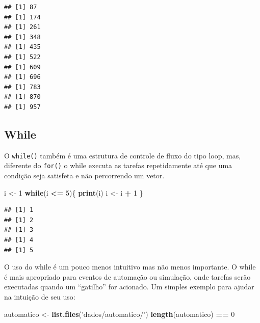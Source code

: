 \documentclass[]{book}
\newenvironment{Shaded}{\begin{snugshade}}{\end{snugshade}}
\newcommand{\KeywordTok}[1]{\textcolor[rgb]{0.13,0.29,0.53}{\textbf{#1}}}
\newcommand{\DecValTok}[1]{\textcolor[rgb]{0.00,0.00,0.81}{#1}}
\newcommand{\StringTok}[1]{\textcolor[rgb]{0.31,0.60,0.02}{#1}}
\newcommand{\ControlFlowTok}[1]{\textcolor[rgb]{0.13,0.29,0.53}{\textbf{#1}}}
\newcommand{\OperatorTok}[1]{\textcolor[rgb]{0.81,0.36,0.00}{\textbf{#1}}}
\newcommand{\NormalTok}[1]{#1}
\begin{document}
\begin{Shaded}
\end{Shaded}

\begin{verbatim}
## [1] 87
## [1] 174
## [1] 261
## [1] 348
## [1] 435
## [1] 522
## [1] 609
## [1] 696
## [1] 783
## [1] 870
## [1] 957
\end{verbatim}

\subsection{While}\label{while}

O \texttt{while()} também é uma estrutura de controle de fluxo do tipo
loop, mas, diferente do \texttt{for()} o while executa as tarefas
repetidamente até que uma condição seja satisfeta e não percorrendo um
vetor.

\begin{Shaded}
\begin{Highlighting}[]
\NormalTok{i <-}\StringTok{ }\DecValTok{1}
\ControlFlowTok{while}\NormalTok{(i }\OperatorTok{<=}\StringTok{ }\DecValTok{5}\NormalTok{)\{}
  \KeywordTok{print}\NormalTok{(i)}
\NormalTok{  i <-}\StringTok{ }\NormalTok{i }\OperatorTok{+}\StringTok{ }\DecValTok{1}
\NormalTok{\}}
\end{Highlighting}
\end{Shaded}

\begin{verbatim}
## [1] 1
## [1] 2
## [1] 3
## [1] 4
## [1] 5
\end{verbatim}

O uso do while é um pouco menos intuitivo mas não menos importante. O
while é mais apropriado para eventos de automação ou simulação, onde
tarefas serão executadas quando um ``gatilho'' for acionado. Um simples
exemplo para ajudar na intuição de seu uso:

\begin{Shaded}
\begin{Highlighting}[]
\NormalTok{automatico <-}\StringTok{ }\KeywordTok{list.files}\NormalTok{(}\StringTok{'dados/automatico/'}\NormalTok{)}
\KeywordTok{length}\NormalTok{(automatico) }\OperatorTok{==}\StringTok{ }\DecValTok{0}
\end{Highlighting}
\end{Shaded}
\end{document}
